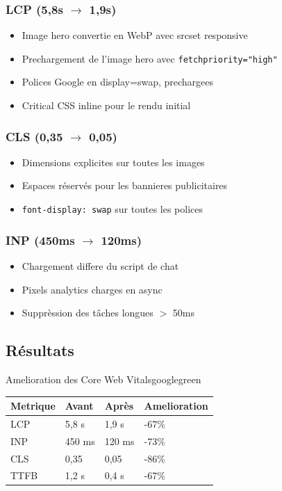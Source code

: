 \documentclass[12pt,a4paper,twoside]{report}
\begin{document}
\subsubsection{LCP (5,8s $\rightarrow$ 1,9s)}
\begin{itemize}
    \item Image hero convertie en WebP avec srcset responsive
    \item Prechargement de l'image hero avec \texttt{fetchpriority="high"}
    \item Polices Google en display=swap, prechargees
    \item Critical CSS inline pour le rendu initial
\end{itemize}

\subsubsection{CLS (0,35 $\rightarrow$ 0,05)}
\begin{itemize}
    \item Dimensions explicites sur toutes les images
    \item Espaces réservés pour les bannieres publicitaires
    \item \texttt{font-display: swap} sur toutes les polices
\end{itemize}

\subsubsection{INP (450ms $\rightarrow$ 120ms)}
\begin{itemize}
    \item Chargement differe du script de chat
    \item Pixels analytics charges en async
    \item Supprèssion des tâches longues $>$ 50ms
\end{itemize}

\subsection{Résultats}

\begin{mybox}{Amelioration des Core Web Vitals}{googlegreen}
\begin{tabular}{llll}
    \toprule
    \textbf{Metrique} & \textbf{Avant} & \textbf{Après} & \textbf{Amelioration} \\
    \midrule
    LCP                & 5,8 s          & 1,9 s          & -67\% \\
    INP                & 450 ms         & 120 ms         & -73\% \\
    CLS                & 0,35           & 0,05           & -86\% \\
    TTFB               & 1,2 s          & 0,4 s          & -67\% \\
    \bottomrule
\end{tabular}
\end{mybox}
\end{document}
